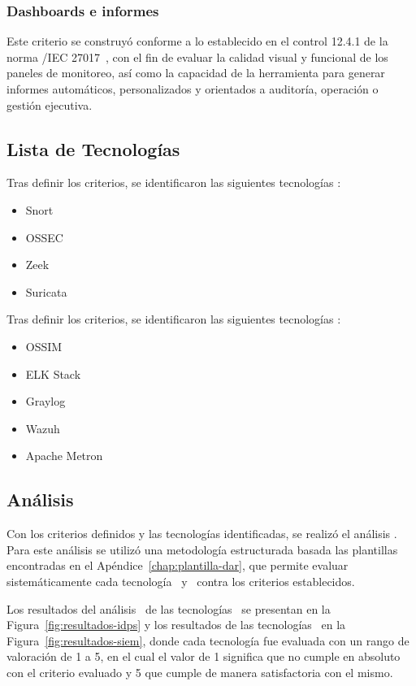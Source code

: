 \subsubsection{Dashboards e informes}

Este criterio se construyó conforme a lo establecido en el control 12.4.1 de la norma \ISO/IEC 27017~\cite{iso27017}, con el fin de evaluar la 
calidad visual y funcional de los paneles de monitoreo, así como la capacidad de la herramienta para generar informes automáticos, 
personalizados y orientados a auditoría, operación o gestión ejecutiva.

\subsection{Lista de Tecnologías}
Tras definir los criterios, se identificaron las siguientes tecnologías \IDPS:
\begin{itemize}
	\item Snort
	\item OSSEC
	\item Zeek
	\item Suricata
\end{itemize}

Tras definir los criterios, se identificaron las siguientes tecnologías \SIEM:
\begin{itemize}
	\item OSSIM
	\item ELK Stack
	\item Graylog
	\item Wazuh
	\item Apache Metron
\end{itemize}

\subsection{Análisis \DAR}

Con los criterios definidos y las tecnologías identificadas, se realizó el análisis \DAR. Para este análisis se utilizó 
una metodología estructurada basada las plantillas encontradas en el Apéndice~\ref{chap:plantilla-dar}, que permite evaluar 
sistemáticamente cada tecnología \IDPS\ y \SIEM\ contra los criterios establecidos.

Los resultados del análisis \DAR\ de las tecnologías \IDPS\ se presentan en la Figura~\ref{fig:resultados-idps} y los resultados de las 
tecnologías \SIEM\ en la Figura~\ref{fig:resultados-siem}, donde cada tecnología fue evaluada con un rango de valoración de 1 a 5, en el 
cual el valor de 1 significa que no cumple en absoluto con el criterio evaluado y 5 que cumple de manera satisfactoria con el mismo.


